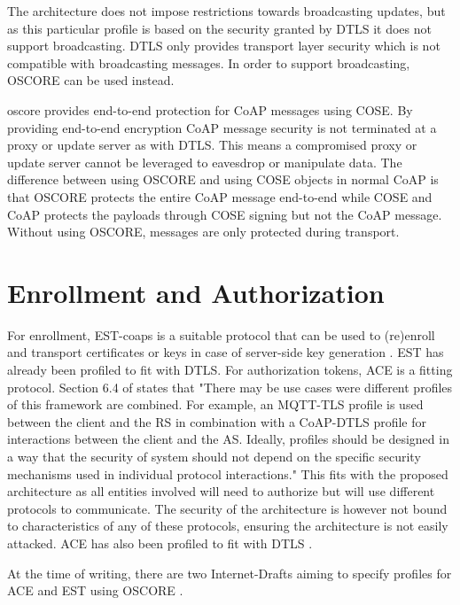 \documentclass[0-thesis.tex]{subfiles}
\begin{document}
The architecture does not impose restrictions towards broadcasting updates, but as this
particular profile is based on the security granted by DTLS it does not support
broadcasting. DTLS only provides transport layer security which is not compatible with
broadcasting messages. In order to support broadcasting, OSCORE can be used instead.


\gls{oscore} provides end-to-end protection for CoAP messages using COSE. By providing
end-to-end encryption CoAP message security is not terminated at a proxy or update server
as with DTLS. This means a compromised proxy or update server cannot be leveraged to
eavesdrop or manipulate data. The difference between using OSCORE and using COSE objects
in normal CoAP is that OSCORE protects the entire CoAP message end-to-end while COSE and
CoAP protects the payloads through COSE signing but not the CoAP message. Without using
OSCORE, messages are only protected during transport.

\section{Enrollment and Authorization}
\label{sec:enrollment-authorization}
For enrollment, EST-coaps is a suitable protocol that can be used to (re)enroll and
transport certificates or keys in case of server-side key generation
\parencite{est-coaps}. EST has already been profiled to fit with DTLS. For authorization
tokens, ACE is a fitting protocol. Section 6.4 of \parencite{ace} states that "There may
be use cases were different profiles of this framework are combined.  For example, an
MQTT-TLS profile is used between the client and the RS in combination with a CoAP-DTLS
profile for interactions between the client and the AS.  Ideally, profiles should be
designed in a way that the security of system should not depend on the specific security
mechanisms used in individual protocol interactions." This fits with the proposed
architecture as all entities involved will need to authorize but will use different
protocols to communicate. The security of the architecture is however not bound to
characteristics of any of these protocols, ensuring the architecture is not easily
attacked. ACE has also been profiled to fit with DTLS \parencite{ace-dtls-profile}.

At the time of writing, there are two Internet-Drafts aiming to specify profiles for ACE
and EST using OSCORE \parencite{ace-oscore, est-oscore}.
\end{document}
